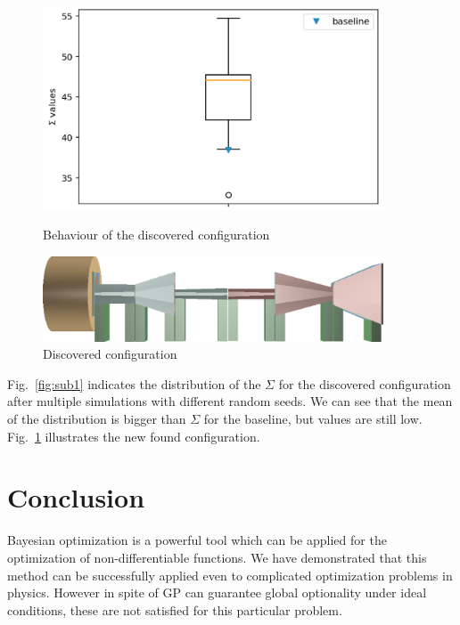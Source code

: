 \documentclass[a4paper]{jpconf}
\theoremstyle{my_theorem_style}
\numberwithin{equation}{section}
\begin{document}
\begin{figure}[H]
\centering
\begin{minipage}[c]{0.45\textwidth}
\includegraphics[width=0.9\textwidth]{pics/solution}
 \caption{\label{fig:sub1} Behaviour of the discovered configuration}
 \end{minipage}
\begin{minipage}[c]{0.45\textwidth}
  \includegraphics[width=0.9\textwidth]{pics/sol_2.png}
  \caption{\label{fig:sub2} Discovered configuration}
\end{minipage}  
\end{figure}

Fig.~\ref{fig:sub1} indicates the distribution of the $\Sigma$ for the
discovered configuration after multiple simulations with different
random seeds. We can see that the mean of the distribution is bigger
than $\Sigma$ for the baseline, but values are still low.  Fig.~\ref{fig:sub2} illustrates the new found configuration.

\section{Conclusion}

Bayesian optimization is a powerful tool which can be applied for the
optimization of non-differentiable functions. We have demonstrated
that this method can be successfully applied even to 
complicated optimization problems in physics. 
However in spite of GP can guarantee global optionality under ideal
conditions,  these are not satisfied for this particular problem.
\end{document}
